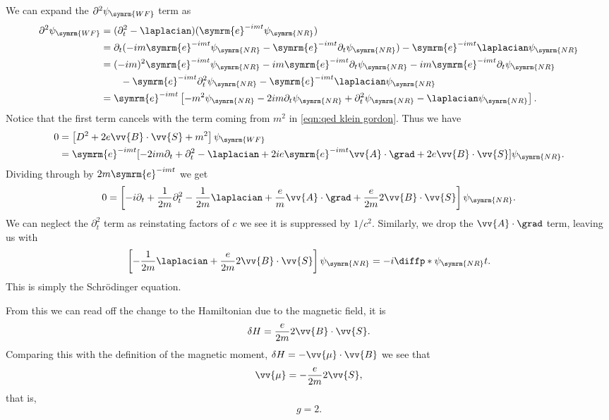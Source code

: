 \documentclass[fleqn]{NotesClass}
\newcommand{\e}{\symrm{e}}
\newcommand{\covariantDerivative}{D}
\newcommand{\dalembertian}{\partial^2}
\begin{document}
    We can expand the \(\dalembertian \psi_{\symrm{WF}}\) term as
    \begin{align}
        \dalembertian \psi_{\symrm{WF}} &= (\partial_t^2 - \laplacian)(\e^{-imt}\psi_{\symrm{NR}})\\
        &= \partial_t(-im\e^{-imt}\psi_{\symrm{NR}} - \e^{-imt} \partial_t \psi_{\symrm{NR}}) - \e^{-imt}\laplacian\psi_{\symrm{NR}}\\
        &= (-im)^2\e^{-imt}\psi_{\symrm{NR}} - im\e^{-imt}\partial_t\psi_{\symrm{NR}} - im\e^{-imt} \partial_t \psi_{\symrm{NR}} \notag\\
        &\qquad - \e^{-imt} \partial_t^2 \psi_{\symrm{NR}} - \e^{-imt}\laplacian\psi_{\symrm{NR}}\\
        &= \e^{-imt} \left[ -m^2\psi_{\symrm{NR}} - 2im\partial_t\psi_{\symrm{NR}} + \partial_t^2 \psi_{\symrm{NR}} - \laplacian \psi_{\symrm{NR}} \right].
    \end{align}
    Notice that the first term cancels with the term coming from \(m^2\) in \cref{eqn:qed klein gordon}.
    Thus we have
    \begin{align}
        0 &= \left[ \covariantDerivative^2 + 2e\vv{B} \cdot \vv{S} + m^2 \right] \psi_{\symrm{WF}}\\
        &= \e^{-imt} [ - 2im\partial_t + \partial_t^2 - \laplacian + 2ie\e^{-imt} \vv{A} \cdot \grad + 2e\vv{B} \cdot \vv{S} ] \psi_{\symrm{NR}}.
    \end{align}
    Dividing through by \(2m\e^{-imt}\) we get
    \begin{equation}
        0 = \left[ -i\partial_t + \frac{1}{2m} \partial_t^2 - \frac{1}{2m} \laplacian + \frac{e}{m} \vv{A} \cdot \grad + \frac{e}{2m} 2\vv{B} \cdot \vv{S} \right] \psi_{\symrm{NR}}.
    \end{equation}
    We can neglect the \(\partial_t^2\) term as reinstating factors of \(c\) we see it is suppressed by \(1/c^2\).
    Similarly, we drop the \(\vv{A} \cdot \grad\) term, leaving us with
    \begin{equation}
        \left[ -\frac{1}{2m} \laplacian + \frac{e}{2m}2\vv{B} \cdot \vv{S} \right] \psi_{\symrm{NR}} = -i\diffp*{\psi_{\symrm{NR}}}{t}.
    \end{equation}
    This is simply the Schrödinger equation.
    
    From this we can read off the change to the Hamiltonian due to the magnetic field, it is
    \begin{equation}
        \delta H = \frac{e}{2m} 2 \vv{B} \cdot \vv{S}.
    \end{equation}
    Comparing this with the definition of the magnetic moment, \(\delta H = -\vv{\mu} \cdot \vv{B}\) we see that
    \begin{equation}
        \vv{\mu} = -\frac{e}{2m}2 \vv{S},
    \end{equation}
    that is, 
    \begin{equation}
        g = 2.
    \end{equation}
    
\end{document}
